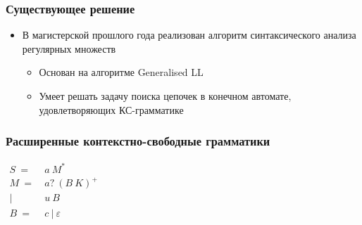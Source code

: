 \documentclass{beamer}
\begin{document}
 \begin{frame}
     \frametitle{Существующее решение}
     \begin{itemize}
         \item В магистерской прошлого года реализован алгоритм синтаксического анализа регулярных множеств
         \begin{itemize}
            \item Основан на алгоритме Generalised LL
            \item Умеет решать задачу поиска цепочек в конечном автомате, удовлетворяющих КС-грамматике
         \end{itemize}
         
     \end{itemize}
 \end{frame}
	\begin{frame} 
		\frametitle{Расширенные контекстно-свободные грамматики}
		\begin{center}
			{$\begin{aligned}
				S\ =&\ a\ M^* \\
				M\ =&\ a?\ (B\ K)^+ \\
				|&\ u\ B \\
				B\ =&\ c\ |\ \varepsilon
				\end{aligned}$}
		\end{center}
	\end{frame}
	

\end{document}
